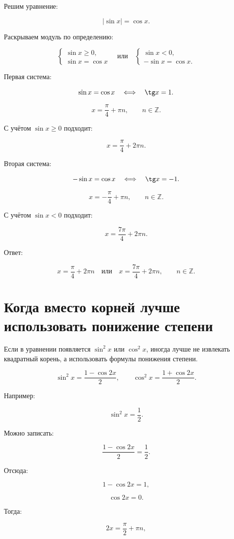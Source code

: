 \documentclass[a4paper,12pt]{article}
\newcommand{\Z}{\mathbb{Z}}
\begin{document}
Решим уравнение:

\[
|\sin x|=\cos x.
\]

Раскрываем модуль по определению:

\[
\begin{cases}
\sin x\ge0,\\
\sin x=\cos x
\end{cases}
\quad\text{или}\quad
\begin{cases}
\sin x<0,\\
-\sin x=\cos x.
\end{cases}
\]

Первая система:

\[
\sin x=\cos x
\quad\Longleftrightarrow\quad
\tg x=1.
\]

\[
x=\frac{\pi}{4}+\pi n,\qquad n\in\Z.
\]

С учётом \(\sin x\ge0\) подходит:

\[
x=\frac{\pi}{4}+2\pi n.
\]

Вторая система:

\[
-\sin x=\cos x
\quad\Longleftrightarrow\quad
\tg x=-1.
\]

\[
x=-\frac{\pi}{4}+\pi n,\qquad n\in\Z.
\]

С учётом \(\sin x<0\) подходит:

\[
x=\frac{7\pi}{4}+2\pi n.
\]

Ответ:

\[
x=\frac{\pi}{4}+2\pi n
\quad\text{или}\quad
x=\frac{7\pi}{4}+2\pi n,\qquad n\in\Z.
\]

\section{Когда вместо корней лучше использовать понижение степени}

Если в уравнении появляется \(\sin^2x\) или \(\cos^2x\), иногда лучше не извлекать квадратный корень, а использовать формулы понижения степени.

\[
\sin^2x=\frac{1-\cos2x}{2},
\qquad
\cos^2x=\frac{1+\cos2x}{2}.
\]

Например:

\[
\sin^2x=\frac12.
\]

Можно записать:

\[
\frac{1-\cos2x}{2}=\frac12.
\]

Отсюда:

\[
1-\cos2x=1,
\]

\[
\cos2x=0.
\]

Тогда:

\[
2x=\frac{\pi}{2}+\pi n,
\]
\end{document}
